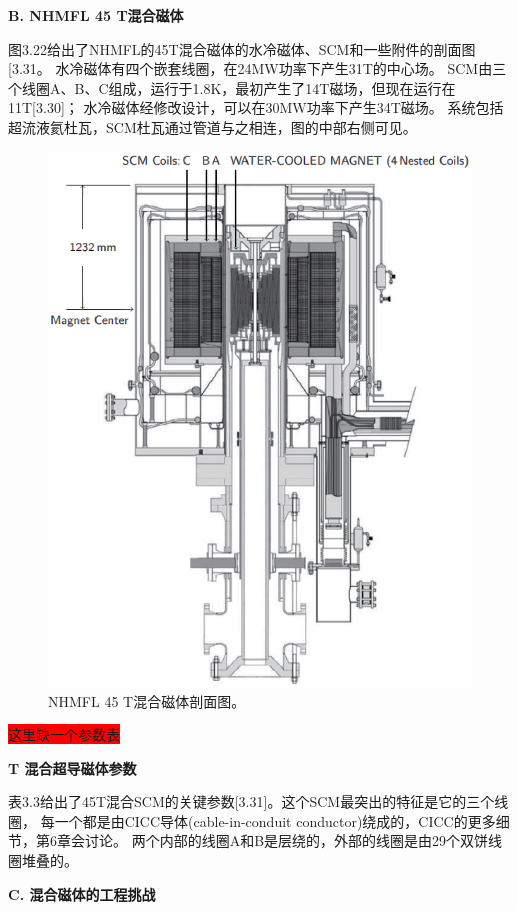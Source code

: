 \textbf{B. NHMFL 45 T混合磁体}

图3.22给出了NHMFL的45T混合磁体的水冷磁体、SCM和一些附件的剖面图[3.31。
水冷磁体有四个嵌套线圈，在24MW功率下产生31T的中心场。
SCM由三个线圈A、B、C组成，运行于1.8K，最初产生了14T磁场，但现在运行在11T[3.30]；
水冷磁体经修改设计，可以在30MW功率下产生34T磁场。
系统包括超流液氦杜瓦，SCM杜瓦通过管道与之相连，图的中部右侧可见。
\begin{figure}[htbp]
	\centering
	\includegraphics[scale=0.7]{chpt3/figs/fig3.22.eps}
	\caption{NHMFL 45 T混合磁体剖面图。}
\end{figure}

\colorbox{red}{这里缺一个参数表}

\textbf{ T 混合超导磁体参数}

表3.3给出了45T混合SCM的关键参数[3.31]。这个SCM最突出的特征是它的三个线圈，
每一个都是由CICC导体(cable-in-conduit conductor)绕成的，CICC的更多细节，第6章会讨论。
两个内部的线圈A和B是层绕的，外部的线圈是由29个双饼线圈堆叠的。

\textbf{C. 混合磁体的工程挑战}

